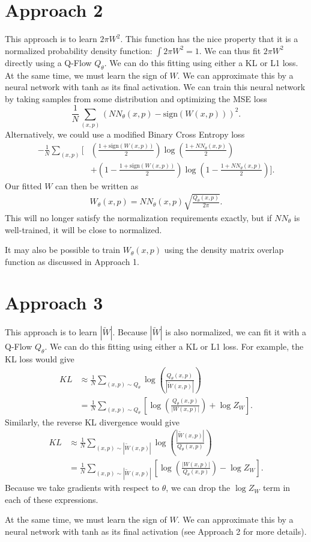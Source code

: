 \documentclass{article}
\begin{document}
\section{Approach 2}
This approach is to learn $2\pi W^2$. This function has the nice property that it is a normalized probability density function: $\int 2\pi W^2 = 1$. We can thus fit $2\pi W^2$ directly using a Q-Flow $Q_\theta$. We can do this fitting using either a KL or L1 loss. At the same time, we must learn the sign of $W$. We can approximate this by a neural network with tanh as its final activation. We can train this neural network by taking samples from some distribution and optimizing the MSE loss\begin{equation*}
    \frac{1}{N}\sum_{(x,p)} (NN_\theta(x,p)-\text{sign}(W(x,p)))^2.
\end{equation*} Alternatively, we could use a modified Binary Cross Entropy loss \begin{align*}
    -\frac{1}{N}\sum_{(x,p)} \Bigg[&\left(\frac{1+\text{sign}(W(x,p))}{2}\right)\log\left(\frac{1+NN_\theta(x,p)}{2}\right)\\
    &+\left(1-\frac{1+\text{sign}(W(x,p))}{2}\right)\log\left(1-\frac{1+NN_\theta(x,p)}{2}\right)\Bigg].
\end{align*} Our fitted $W$ can then be written as \begin{align*}
    W_\theta(x,p) = NN_\theta(x,p)\sqrt{\frac{Q_\theta(x,p)}{2\pi}}.
\end{align*} This will no longer satisfy the normalization requirements exactly, but if $NN_\theta$ is well-trained, it will be close to normalized.

It may also be possible to train $W_\theta(x,p)$ using the density matrix overlap function as discussed in Approach 1.

\section{Approach 3}
This approach is to learn $|\widetilde{W}|$. Because $|\widetilde{W}|$ is also normalized, we can fit it with a Q-Flow $Q_\theta$. We can do this fitting using either a KL or L1 loss. For example, the KL loss would give \begin{align*}
    KL &\approx \frac{1}{N}\sum_{(x,p)\sim Q_\theta}\log\left(\frac{Q_\theta(x,p)}{|\widetilde{W}(x,p)|}\right)\\
    &= \frac{1}{N}\sum_{(x,p)\sim Q_\theta}\left[\log\left(\frac{Q_\theta(x,p)}{|W(x,p)|}\right)+\log Z_W\right].
\end{align*} Similarly, the reverse KL divergence would give \begin{align*}
    KL &\approx \frac{1}{N}\sum_{(x,p)\sim |\widetilde{W}(x,p)|}\log\left(\frac{|\widetilde{W}(x,p)|}{Q_\theta(x,p)}\right)\\
    &= \frac{1}{N}\sum_{(x,p)\sim |\widetilde{W}(x,p)|}\left[\log\left(\frac{|W(x,p)|}{Q_\theta(x,p)}\right)-\log Z_W\right].
\end{align*}Because we take gradients with respect to $\theta$, we can drop the $\log Z_W$ term in each of these expressions.

At the same time, we must learn the sign of $W$. We can approximate this by a neural network with tanh as its final activation (see Approach 2 for more details).
\end{document}
